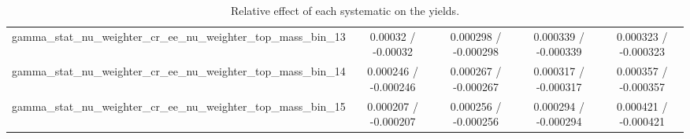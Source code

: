\documentclass[10pt]{article}
\begin{document}
\begin{table}[htbp]
\begin{center}
\begin{tabular}{|c|c|c|c|c|}
  gamma_stat_nu_weighter_cr_ee_nu_weighter_top_mass_bin_13 & 0.00032 / -0.00032 & 0.000298 / -0.000298 & 0.000339 / -0.000339 & 0.000323 / -0.000323 \\ 
  gamma_stat_nu_weighter_cr_ee_nu_weighter_top_mass_bin_14 & 0.000246 / -0.000246 & 0.000267 / -0.000267 & 0.000317 / -0.000317 & 0.000357 / -0.000357 \\ 
  gamma_stat_nu_weighter_cr_ee_nu_weighter_top_mass_bin_15 & 0.000207 / -0.000207 & 0.000256 / -0.000256 & 0.000294 / -0.000294 & 0.000421 / -0.000421 \\ 
\hline 
\end{tabular} 
\caption{Relative effect of each systematic on the yields.} 
\end{center} 
\end{table} 
\end{document}
